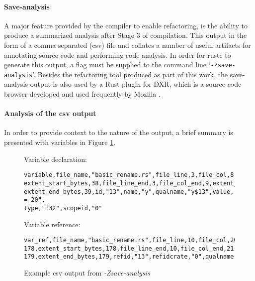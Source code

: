 \paragraph{Save-analysis}
A major feature provided by the compiler to enable refactoring, is the ability to produce a summarized analysis after Stage 3 of compilation. This output in the form of a comma separated (csv) file and collates a number of useful artifacts for annotating source code and performing code analysis. In order for rustc to generate this output, a flag must be supplied to the command line `{\verb|-Zsave-analysis|}'. Besides the refactoring tool produced as part of this work, the save-analysis output is also used by a Rust plugin for DXR, which is a source code browser developed and used frequently by Mozilla \cite{dxr15}.  


\paragraph{Analysis of the csv output}
In order to provide context to the nature of the output, a brief summary is presented with variables in Figure \ref{Fig:csv}.

\begin{figure}
\vspace{5mm}
\noindent
Variable declaration:
\begin{verbatim}
variable,file_name,"basic_rename.rs",file_line,3,file_col,8,extent_start,38,
extent_start_bytes,38,file_line_end,3,file_col_end,9,extent_end,39,
extent_end_bytes,39,id,"13",name,"y",qualname,"y$13",value,"y = 20",
type,"i32",scopeid,"0"
\end{verbatim}

\noindent
Variable reference:
\begin{verbatim}
var_ref,file_name,"basic_rename.rs",file_line,10,file_col,20,extent_start,
178,extent_start_bytes,178,file_line_end,10,file_col_end,21,extent_end,
179,extent_end_bytes,179,refid,"13",refidcrate,"0",qualname,"",scopeid,"4"
\end{verbatim}

\caption{Example csv output from \emph{-Zsave-analysis}}
\label{Fig:csv}
\end{figure}

